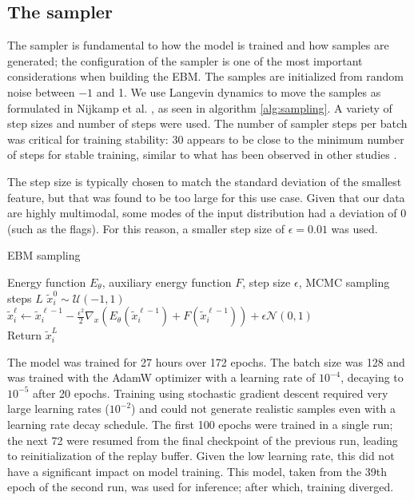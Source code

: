 \subsection{The sampler}

The sampler is fundamental to how the model is trained and how samples are generated; the configuration of the sampler is one of the most important considerations when building the EBM. The samples are initialized from random noise between $-1$ and 1. We use Langevin dynamics to move the samples as formulated in Nijkamp et al. \cite{nijkamp_anatomy_2020}, as seen in algorithm \ref{alg:sampling}. A variety of step sizes and number of steps were used. The number of sampler steps per batch was critical for training stability: 30 appears to be close to the minimum number of steps for stable training, similar to what has been observed in other studies \cite{cheng_versatile_2024}.

The step size is typically chosen to match the standard deviation of the smallest feature, but that was found to be too large for this use case. Given that our data are highly multimodal, some modes of the input distribution had a deviation of 0 (such as the flags).  For this reason, a smaller step size of $\epsilon = 0.01$ was used. 

\begin{algorithm}
\caption{EBM sampling}\label{alg:sampling}
\begin{algorithmic}
\Require Energy function $E_\theta$, auxiliary energy function $F$, step size $\epsilon$, MCMC sampling steps $L$
	\State $\tilde{x}_{i}^0 \sim \mathcal{U}(-1,1)$ 
	  
		\State $\tilde{x}_{i}^\ell \gets \tilde{x}_{i}^{\ell-1} - \frac{\epsilon^2}{2}\nabla_x \left( E_\theta(\tilde{x}_{i}^{\ell-1}) + F(\tilde{x}_{i}^{\ell-1}) \right)+ \epsilon \mathcal{N}(0, 1)$
	\EndFor
	\\
	\State Return $\tilde{x}_{i}^{L}$
	
\end{algorithmic}
\end{algorithm}

The model was trained for 27 hours over 172 epochs. The batch size was 128 and was trained with the AdamW optimizer with a learning rate of $10^{-4}$, decaying to $10^{-5}$ after 20 epochs. Training using stochastic gradient descent required very large learning rates ($10^{-2}$) and could not generate realistic samples even with a learning rate decay schedule. The first 100 epochs were trained in a single run; the next 72  were resumed from the final checkpoint of the previous run, leading to reinitialization of the replay buffer. Given the low learning rate, this did not have a significant impact on model training. This model, taken from the 39th epoch of the second run, was used for inference; after which, training diverged. 

